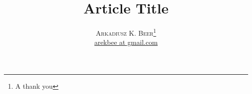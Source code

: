 \documentclass{standalone}
\begin{document}

\author{
\large
\textsc{Arkadiusz K. Beer}\thanks{A thank you }\\[2mm] %
\normalsize \href{mailto:arekbee@gmail.com}{arekbee at gmail.com} %
\vspace{-5mm}
}
\date{}

\title{\vspace{-15mm}\fontsize{24pt}{10pt}\selectfont\textbf{Article Title}} %






\maketitle %
\thispagestyle{fancy} %
\end{document}
